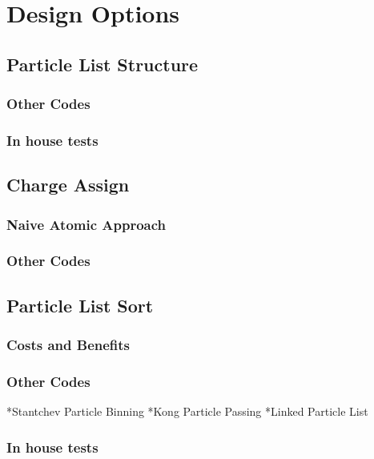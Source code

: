 \chapter{Design Options}
\label{ch:design}

	\section{Particle List Structure}
		\subsection{Other Codes}
		\subsection{In house tests}

	\section{Charge Assign}
		\subsection{Naive Atomic Approach}
		\subsection{Other Codes}

	\section{Particle List Sort}
		\subsection{Costs and Benefits}
		\subsection{Other Codes}
		*Stantchev Particle Binning
		*Kong Particle Passing
		*Linked Particle List
		\subsection{In house tests}


